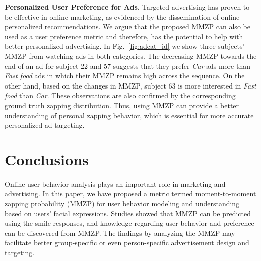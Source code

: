 \documentclass[twoside,leqno,twocolumn]{article}
\begin{document}
\noindent \textbf{Personalized User Preference for Ads.} Targeted advertising has proven to be effective in online marketing, as evidenced by the dissemination of online personalized recommendations. We argue that the proposed MMZP can also be used as a user preference metric and therefore, has the potential to help with better personalized advertising. In Fig.~\ref{fig:adcat_id} we show three subjects' MMZP from watching ads in both categories. The decreasing MMZP towards the end of an ad for subject 22 and 57 suggests that they prefer \textit{Car} ads more than \textit{Fast food} ads in which their MMZP remains high across the sequence. On the other hand, based on the changes in MMZP, subject 63 is more interested in \textit{Fast food} than \textit{Car}. These observations are also confirmed by the corresponding ground truth zapping distribution. Thus, using MMZP can provide a better understanding of personal zapping behavior, which is essential for more accurate personalized ad targeting.


\section{Conclusions}

Online user behavior analysis plays an important role in marketing and advertising. In this paper, we have proposed a metric termed moment-to-moment zapping probability (MMZP) for user behavior modeling and understanding based on users' facial expressions. Studies showed that MMZP can be predicted using the smile responses, and knowledge regarding user behavior and preference can be discovered from MMZP. The findings by analyzing the MMZP may facilitate better group-specific or even person-specific advertisement design and targeting. 




\end{document}
